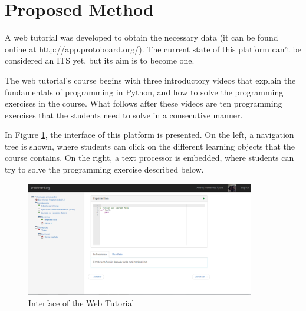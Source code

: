 \documentclass[runningheads,a4paper]{llncs}
\begin{document}

\section{Proposed Method}
\label{proposed-method}


A web tutorial was developed to obtain the necessary data  (it can be found online at http://app.protoboard.org/). The current state of this platform can't be considered an ITS yet, but its aim is to become one.

The web tutorial's course begins with three introductory videos that explain the fundamentals of programming in Python, and how to solve the programming exercises in the course. What follows after these videos are ten programming exercises that the students need to solve in a consecutive manner.

In Figure \ref{protoboard}, the interface of this platform is presented. On the left, a navigation tree is shown, where students can click on the different learning objects that the course contains. On the right, a text processor is embedded, where students can try to solve the programming exercise described below.

\begin{figure}[htp]
  \centerline{\includegraphics[width=10cm]{protoboard.png}}
  \caption{Interface of the Web Tutorial}
  \label{protoboard}
\end{figure}
\end{document}
